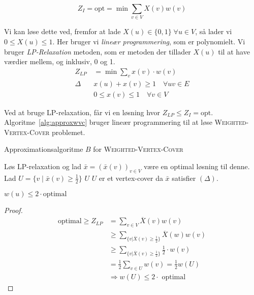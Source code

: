 \begin{equation*}
	Z_{I} = \text{opt} = \min \sum_{v \in V} X(v) w(v)
\end{equation*}

Vi kan løse dette ved, fremfor at lade $X(u) \in \{0,1\}\; \forall u \in V$, så lader vi $0 \le X(u) \le 1$. Her bruger vi \textit{lineær programmering}, som er polynomielt. Vi bruger \textit{LP-Relaxation} metoden, som er metoden der tillader $X(u)$ til at have værdier mellem, og inklusiv, 0 og 1.
\begin{align*}
	Z_{LP}        & = \min \sum_{v} x(v) \cdot w(v)           \\
	\Delta	 \quad & x(u) + x(v) \geq 1 \quad \forall uv \in E \\
	              & 0 \leq x(v) \leq 1 \quad \forall v \in V
\end{align*}

Ved at bruge LP-relaxation, får vi en løsning hvor $Z_{LP} \le Z_{I} = \text{opt}$. Algoritme~\ref{alg:approxwvc} bruger lineær programmering til at løse \textsc{Weighted-Vertex-Cover} problemet.

\begin{algorithm}
	\caption{\label{alg:approxwvc}Approximationsalgoritme $B$ for \textsc{Weighted-Vertex-Cover}}
	\begin{algorithmic}[1]
		\STATE Løs LP-relaxation og lad $\bar{x} = (\bar{x}(v))_{v \in V}$ være en optimal løsning til denne.
		\STATE Lad $U = \{v \mid \bar{x}(v) \geq \frac{1}{2}\}$
		\RETURN $U$
		\STATE $U$ er et vertex-cover da $\bar{x}$ satisfier $(\Delta)$.
	\end{algorithmic}
\end{algorithm}

\begin{claim}
	$w(u) \le 2 \cdot \text{optimal}$
\end{claim}

\begin{proof}
	\begin{align*}
		\text{optimal} \ge Z_{LP} & = \sum_{v \in V} \overline{X}(v)w(v)                                      \\
		                          & \ge \sum_{\{ v |\overline{X}(v) \ge \frac{1}{2}\}} \overline{X}(w)w(v)    \\
		                          & \ge \sum_{\{ v |\overline{X}(v) \ge \frac{1}{2}\}} \frac{1}{2} \cdot w(v) \\
		                          & = \frac{1}{2} \sum_{v \in U} w(v) = \frac{1}{2} w(U)                      \\
		                          & \Rightarrow w(U) \le 2 \cdot \text{ optimal}
	\end{align*}
\end{proof}

